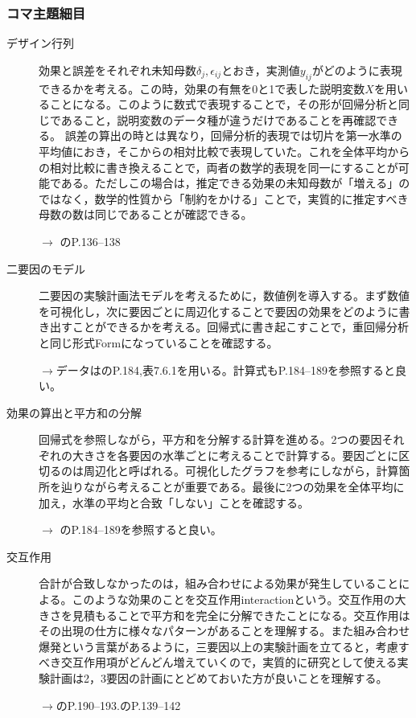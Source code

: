 \subsubsection{コマ主題細目}
\begin{description}

\item[デザイン行列]効果と誤差をそれぞれ未知母数$\delta_j,\epsilon_{ij}$とおき，実測値${y_{ij}}$がどのように表現できるかを考える。この時，効果の有無を0と1で表した説明変数$X$を用いることになる。このように数式で表現することで，その形が回帰分析と同じであること，説明変数のデータ種が違うだけであることを再確認できる。
誤差の算出の時とは異なり，回帰分析的表現では切片を第一水準の平均値におき，そこからの相対比較で表現していた。これを全体平均からの相対比較に書き換えることで，両者の数学的表現を同一にすることが可能である。ただしこの場合は，推定できる効果の未知母数が「増える」のではなく，数学的性質から「制約をかける」ことで，実質的に推定すべき母数の数は同じであることが確認できる。
\begin{flushright}
    $\to$ \citet{kosugi2018}のP.136--138
\end{flushright}

\item[二要因のモデル]二要因の実験計画法モデルを考えるために，数値例を導入する。まず数値を可視化し，次に要因ごとに周辺化することで要因の効果をどのように書き出すことができるかを考える。回帰式に書き起こすことで，重回帰分析と同じ形式Formになっていることを確認する。
\begin{flushright}
    $\to$データは\citet{Yamada2004}のP.184,表7.6.1を用いる。計算式もP.184--189を参照すると良い。
\end{flushright}

\item[効果の算出と平方和の分解]回帰式を参照しながら，平方和を分解する計算を進める。2つの要因それぞれの大きさを各要因の水準ごとに考えることで計算する。要因ごとに区切るのは周辺化と呼ばれる。可視化したグラフを参考にしながら，計算箇所を辿りながら考えることが重要である。最後に2つの効果を全体平均に加え，水準の平均と合致「しない」ことを確認する。
\begin{flushright}
    $\to$ \citet{Yamada2004}のP.184--189を参照すると良い。
\end{flushright}

\item[交互作用]合計が合致しなかったのは，組み合わせによる効果が発生していることによる。このような効果のことを交互作用interactionという。交互作用の大きさを見積もることで平方和を完全に分解できたことになる。交互作用はその出現の仕方に様々なパターンがあることを理解する。また組み合わせ爆発という言葉があるように，三要因以上の実験計画を立てると，考慮すべき交互作用項がどんどん増えていくので，実質的に研究として使える実験計画は2，3要因の計画にとどめておいた方が良いことを理解する。
\begin{flushright}
    $\to$\citet{Yamada2004}のP.190--193.\citet{kosugi2019}のP.139--142
\end{flushright}


\end{description}
